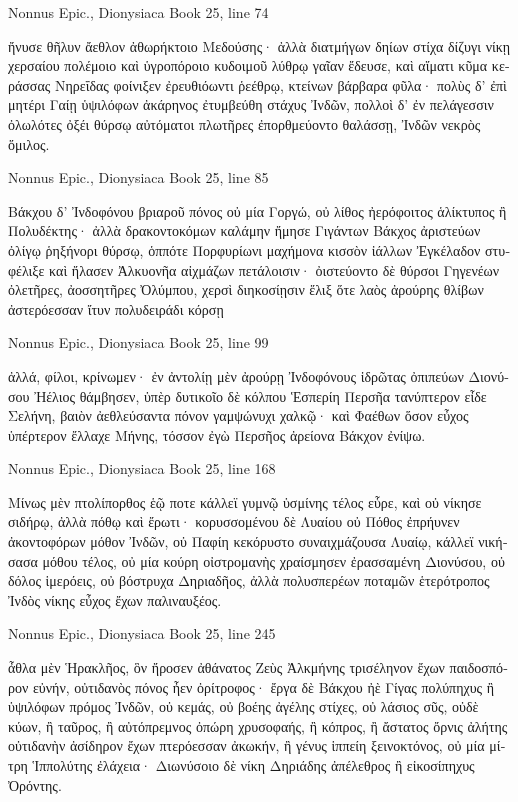 \documentclass[12pt,letterpaper,twoside,final]{memoir}
\begin{document}
\begin{greek}
Nonnus Epic., Dionysiaca 
Book 25, line 74

ἤνυσε θῆλυν ἄεθλον ἀθωρήκτοιο Μεδούσης· 
ἀλλὰ διατμήγων δηίων στίχα δίζυγι νίκῃ 
χερσαίου πολέμοιο καὶ ὑγροπόροιο κυδοιμοῦ 
λύθρῳ γαῖαν ἔδευσε, καὶ αἵματι κῦμα κεράσσας 
Νηρεΐδας φοίνιξεν ἐρευθιόωντι ῥεέθρῳ, 
κτείνων βάρβαρα φῦλα· πολὺς δ' ἐπὶ μητέρι Γαίῃ 
ὑψιλόφων ἀκάρηνος ἐτυμβεύθη στάχυς Ἰνδῶν, 
πολλοὶ δ' ἐν πελάγεσσιν ὀλωλότες ὀξέι θύρσῳ 
αὐτόματοι πλωτῆρες ἐπορθμεύοντο θαλάσσῃ, 
Ἰνδῶν νεκρὸς ὅμιλος. 



Nonnus Epic., Dionysiaca 
Book 25, line 85

Βάκχου δ' Ἰνδοφόνου βριαροῦ πόνος οὐ μία Γοργώ, 
οὐ λίθος ἠερόφοιτος ἁλίκτυπος ἢ Πολυδέκτης· 
ἀλλὰ δρακοντοκόμων καλάμην ἤμησε Γιγάντων 
Βάκχος ἀριστεύων ὀλίγῳ ῥηξήνορι θύρσῳ, 
ὁππότε Πορφυρίωνι μαχήμονα κισσὸν ἰάλλων 
Ἐγκέλαδον στυφέλιξε καὶ ἤλασεν Ἀλκυονῆα 
αἰχμάζων πετάλοισιν· ὀιστεύοντο δὲ θύρσοι 
Γηγενέων ὀλετῆρες, ἀοσσητῆρες Ὀλύμπου, 
χερσὶ διηκοσίῃσιν ἕλιξ ὅτε λαὸς ἀρούρης 
θλίβων ἀστερόεσσαν ἴτυν πολυδειράδι κόρσῃ 




Nonnus Epic., Dionysiaca 
Book 25, line 99

ἀλλά, φίλοι, κρίνωμεν· ἐν ἀντολίῃ μὲν ἀρούρῃ 
Ἰνδοφόνους ἱδρῶτας ὀπιπεύων Διονύσου 
Ἠέλιος θάμβησεν, ὑπὲρ δυτικοῖο δὲ κόλπου 
Ἑσπερίη Περσῆα τανύπτερον εἶδε Σελήνη, 
βαιὸν ἀεθλεύσαντα πόνον γαμψώνυχι χαλκῷ· 
καὶ Φαέθων ὅσον εὖχος ὑπέρτερον ἔλλαχε Μήνης, 
τόσσον ἐγὼ Περσῆος ἀρείονα Βάκχον ἐνίψω. 



Nonnus Epic., Dionysiaca 
Book 25, line 168

Μίνως μὲν πτολίπορθος ἑῷ ποτε κάλλεϊ γυμνῷ 
ὑσμίνης τέλος εὗρε, καὶ οὐ νίκησε σιδήρῳ, 
ἀλλὰ πόθῳ καὶ ἔρωτι· κορυσσομένου δὲ Λυαίου 
οὐ Πόθος ἐπρήυνεν ἀκοντοφόρων μόθον Ἰνδῶν, 
οὐ Παφίη κεκόρυστο συναιχμάζουσα Λυαίῳ, 
κάλλεϊ νικήσασα μόθου τέλος, οὐ μία κούρη 
οἰστρομανὴς χραίσμησεν ἐρασσαμένη Διονύσου, 
οὐ δόλος ἱμερόεις, οὐ βόστρυχα Δηριαδῆος, 
ἀλλὰ πολυσπερέων ποταμῶν ἑτερότροπος Ἰνδὸς 
νίκης εὖχος ἔχων παλιναυξέος. 



Nonnus Epic., Dionysiaca 
Book 25, line 245

ἆθλα μὲν Ἡρακλῆος, ὃν ἤροσεν ἀθάνατος Ζεὺς 
Ἀλκμήνης τρισέληνον ἔχων παιδοσπόρον εὐνήν, 
οὐτιδανὸς πόνος ἦεν ὀρίτροφος· ἔργα δὲ Βάκχου 
ἠὲ Γίγας πολύπηχυς ἢ ὑψιλόφων πρόμος Ἰνδῶν, 
οὐ κεμάς, οὐ βοέης ἀγέλης στίχες, οὐ λάσιος σῦς, 
οὐδὲ κύων, ἢ ταῦρος, ἢ αὐτόπρεμνος ὀπώρη 
χρυσοφαής, ἢ κόπρος, ἢ ἄστατος ὄρνις ἀλήτης 
οὐτιδανὴν ἀσίδηρον ἔχων πτερόεσσαν ἀκωκήν, 
ἢ γένυς ἱππείη ξεινοκτόνος, οὐ μία μίτρη 
Ἱππολύτης ἐλάχεια· Διωνύσοιο δὲ νίκη 
Δηριάδης ἀπέλεθρος ἢ εἰκοσίπηχυς Ὀρόντης. 




\end{greek}
\end{document}
